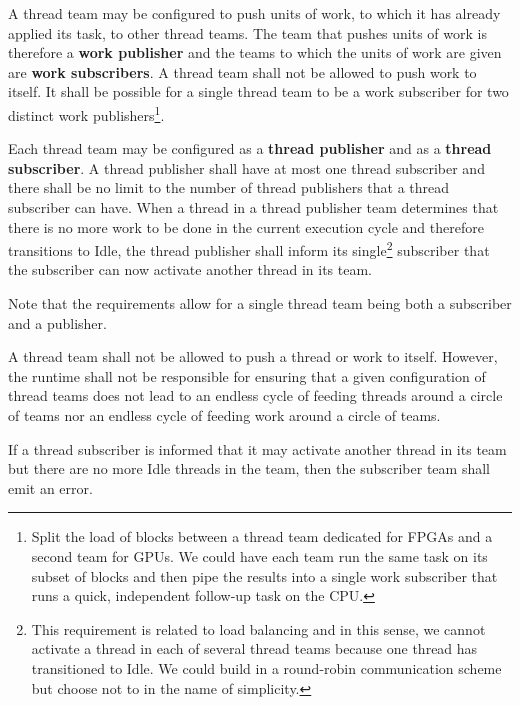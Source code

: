 \documentclass{article}
\begin{document}
\begin{req}
A thread team may be configured to push units of work, to which it has already
applied its task, to other thread teams.  The team that pushes units of work is
therefore a \textbf{work publisher} and the teams to which the units of work are
given are \textbf{work subscribers}.  A thread team shall not be allowed to push
work to itself.  It shall be possible for a single thread team to be a work
subscriber for two distinct work publishers\footnote{Split the load of blocks
between a thread team dedicated for FPGAs and a second team for GPUs.  We could
have each team run the same task on its subset of blocks and then pipe the
results into a single work subscriber that runs a quick, independent follow-up
task on the CPU.}.
\end{req}

\begin{req}
Each thread team may be configured as a \textbf{thread publisher} and as a
\textbf{thread subscriber}.  A thread publisher shall have at most one thread
subscriber and there shall be no limit to the number of thread publishers that a
thread subscriber can have.  When a thread in a thread publisher team determines
that there is no more work to be done in the current execution cycle and
therefore transitions to Idle, the thread publisher shall inform its
single\footnote{This requirement is related to load balancing and in this sense,
we cannot activate a thread in each of several thread teams because one thread
has transitioned to Idle.  We could build in a round-robin communication
scheme but choose not to in the name of simplicity.} subscriber that the
subscriber can now activate another thread in its team.
\end{req}

Note that the requirements allow for a single thread team being both a
subscriber and a publisher.

\begin{req}
A thread team shall not be allowed to push a thread or work to itself.  However,
the runtime shall not be responsible for ensuring that a given configuration of
thread teams does not lead to an endless cycle of feeding threads around a
circle of teams nor an endless cycle of feeding work around a circle of teams.
\end{req}

\begin{req}
If a thread subscriber is informed that it may activate another thread in its
team but there are no more Idle threads in the team, then the
subscriber team shall emit an error.
\end{req}
\end{document}
